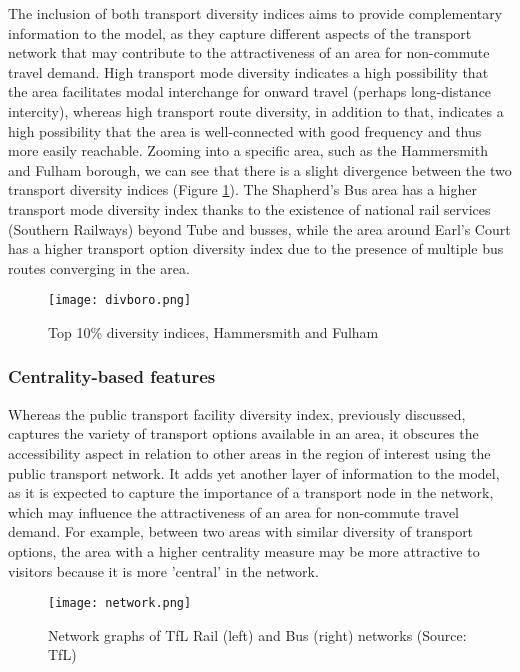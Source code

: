 The inclusion of both transport diversity indices aims to provide complementary information to the model, as they capture different aspects of the transport network that may contribute to the attractiveness of an area for non-commute travel demand. High transport mode diversity indicates a high possibility that the area facilitates modal interchange for onward travel (perhaps long-distance intercity), whereas high transport route diversity, in addition to that, indicates a high possibility that the area is well-connected with good frequency and thus more easily reachable. Zooming into a specific area, such as the Hammersmith and Fulham borough, we can see that there is a slight divergence between the two transport diversity indices (Figure \ref{fig:diversityboro}). The Shapherd's Bus area has a higher transport mode diversity index thanks to the existence of national rail services (Southern Railways) beyond Tube and busses, while the area around Earl's Court has a higher transport option diversity index due to the presence of multiple bus routes converging in the area.

\begin{figure}[hbt]
    \centering
    \texttt{[image: divboro.png]}
    \captionsetup{justification=centering}
    \caption{Top 10\% diversity indices, Hammersmith and Fulham}
    \label{fig:diversityboro}
\end{figure}

\subsubsection*{Centrality-based features}
Whereas the public transport facility diversity index, previously discussed, captures the variety of transport options available in an area, it obscures the accessibility aspect in relation to other areas in the region of interest using the public transport network. It adds yet another layer of information to the model, as it is expected to capture the importance of a transport node in the network, which may influence the attractiveness of an area for non-commute travel demand. For example, between two areas with similar diversity of transport options, the area with a higher centrality measure may be more attractive to visitors because it is more 'central' in the network. 

\begin{figure}[!ht]
    \centering
    \texttt{[image: network.png]}
    \captionsetup{justification=centering}
    \caption{Network graphs of TfL Rail (left) and Bus (right) networks (Source: TfL)}
    \label{fig:network}
\end{figure}


